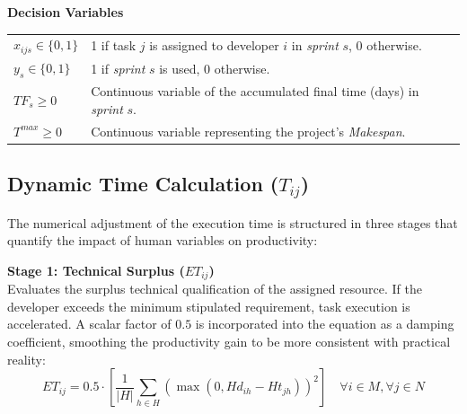 \documentclass[a4paper,11pt]{article}
\begin{document}
\vspace{0.3cm}
\noindent\textbf{Decision Variables}
\begin{center}
    \begin{tabular}{p{2.5cm} p{12cm}}
        $x_{ijs} \in \{0, 1\}$ & 1 if task $j$ is assigned to developer $i$ in \textit{sprint} $s$, 0 otherwise. \\
        $y_s \in \{0, 1\}$ & 1 if \textit{sprint} $s$ is used, 0 otherwise. \\
        $TF_s \ge 0$ & Continuous variable of the accumulated final time (days) in \textit{sprint} $s$. \\
        $T^{max} \ge 0$ & Continuous variable representing the project's \textit{Makespan}.
    \end{tabular}
\end{center}

\subsection{Dynamic Time Calculation \texorpdfstring{($T_{ij}$)}{Tij}}

The numerical adjustment of the execution time is structured in three stages 
that quantify the impact of human variables on productivity:

\vspace{0.2cm}
\noindent\textbf{Stage 1: Technical Surplus ($ET_{ij}$)} \\
Evaluates the surplus technical qualification of the assigned resource. If the 
developer exceeds the minimum stipulated requirement, task execution is accelerated. 
A scalar factor of $0.5$ is incorporated into the equation as a damping 
coefficient, smoothing the productivity gain to be more consistent with 
practical reality:
\begin{equation}
    ET_{ij} = 0.5 \cdot \left[ \frac{1}{|H|} \sum_{h \in H} \left(\max(0, Hd_{ih} - Ht_{jh})\right)^2 \right] \quad \forall i \in M, \forall j \in N
\end{equation}
\end{document}

